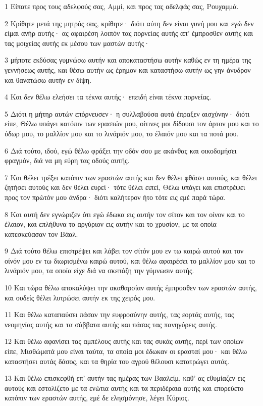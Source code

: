 \par 1 Είπατε προς τους αδελφούς σας, Αμμί, και προς τας αδελφάς σας, Ρουχαμμά.
\par 2 Κρίθητε μετά της μητρός σας, κρίθητε· διότι αύτη δεν είναι γυνή μου και εγώ δεν είμαι ανήρ αυτής· ας αφαιρέση λοιπόν τας πορνείας αυτής απ' έμπροσθεν αυτής και τας μοιχείας αυτής εκ μέσου των μαστών αυτής·
\par 3 μήποτε εκδύσας γυμνώσω αυτήν και αποκαταστήσω αυτήν καθώς εν τη ημέρα της γεννήσεως αυτής, και θέσω αυτήν ως έρημον και καταστήσω αυτήν ως γην άνυδρον και θανατώσω αυτήν εν δίψη.
\par 4 Και δεν θέλω ελεήσει τα τέκνα αυτής· επειδή είναι τέκνα πορνείας.
\par 5 Διότι η μήτηρ αυτών επόρνευσεν· η συλλαβούσα αυτά έπραξεν αισχύνην· διότι είπε, Θέλω υπάγει κατόπιν των εραστών μου, οίτινες μοι δίδουσι τον άρτον μου και το ύδωρ μου, το μαλλίον μου και το λινάριόν μου, το έλαιόν μου και τα ποτά μου.
\par 6 Διά τούτο, ιδού, εγώ θέλω φράξει την οδόν σου με ακάνθας και οικοδομήσει φραγμόν, διά να μη εύρη τας οδούς αυτής.
\par 7 Και θέλει τρέξει κατόπιν των εραστών αυτής και δεν θέλει φθάσει αυτούς, και θέλει ζητήσει αυτούς και δεν θέλει ευρεί· τότε θέλει ειπεί, Θέλω υπάγει και επιστρέψει προς τον πρώτόν μου άνδρα· διότι καλήτερον ήτο τότε εις εμέ παρά τώρα.
\par 8 Και αυτή δεν εγνώριζεν ότι εγώ έδωκα εις αυτήν τον σίτον και τον οίνον και το έλαιον, και επλήθυνα το αργύριον εις αυτήν και το χρυσίον, με τα οποία κατεσκεύασαν τον Βάαλ.
\par 9 Διά τούτο θέλω επιστρέψει και λάβει τον σίτόν μου εν τω καιρώ αυτού και τον οίνόν μου εν τω διωρισμένω καιρώ αυτού, και θέλω αφαιρέσει το μαλλίον μου και το λινάριόν μου, τα οποία είχε διά να σκεπάζη την γύμνωσιν αυτής.
\par 10 Και τώρα θέλω αποκαλύψει την ακαθαρσίαν αυτής έμπροσθεν των εραστών αυτής, και ουδείς θέλει λυτρώσει αυτήν εκ της χειρός μου.
\par 11 Και θέλω καταπαύσει πάσαν την ευφροσύνην αυτής, τας εορτάς αυτής, τας νεομηνίας αυτής και τα σάββατα αυτής και πάσας τας πανηγύρεις αυτής.
\par 12 Και θέλω αφανίσει τας αμπέλους αυτής και τας συκάς αυτής, περί των οποίων είπε, Μισθώματά μου είναι ταύτα, τα οποία μοι έδωκαν οι ερασταί μου· και θέλω καταστήσει αυτάς δάσος, και τα θηρία του αγρού θέλουσι κατατρώγει αυτάς.
\par 13 Και θέλω επισκεφθή επ' αυτήν τας ημέρας των Βααλείμ, καθ' ας εθυμίαζεν εις αυτούς και εστολίζετο με τα ενώτια αυτής και τα περιδέραια αυτής και επορεύετο κατόπιν των εραστών αυτής, εμέ δε ελησμόνησε, λέγει Κύριος.
